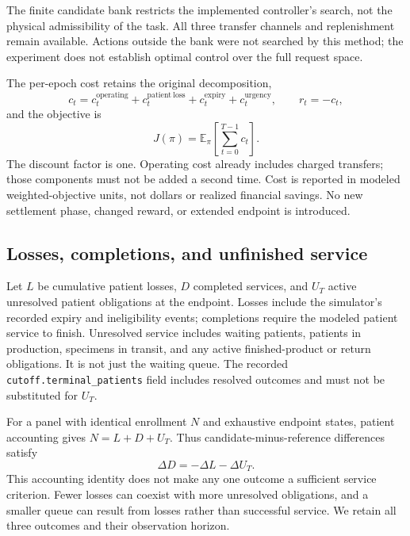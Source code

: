 \documentclass[preprint,12pt]{elsarticle}
\begin{document}
The finite candidate bank restricts the implemented controller's search, not the
physical admissibility of the task. All three transfer channels and replenishment
remain available. Actions outside the bank were not searched by this method;
the experiment does not establish optimal control over the full request space.

The per-epoch cost retains the original decomposition,
\begin{equation}
 c_t=c_t^{\mathrm{operating}}+c_t^{\mathrm{patient\ loss}}
     +c_t^{\mathrm{expiry}}+c_t^{\mathrm{urgency}},
 \qquad r_t=-c_t,
 \label{eq:cost}
\end{equation}
and the objective is
\begin{equation}
 J(\pi)=\mathbb{E}_{\pi}\!\left[\sum_{t=0}^{T-1}c_t\right].
 \label{eq:objective}
\end{equation}
The discount factor is one. Operating cost already includes charged transfers;
those components must not be added a second time. Cost is reported in modeled
weighted-objective units, not dollars or realized financial savings. No new
settlement phase, changed reward, or extended endpoint is introduced.

\subsection{Losses, completions, and unfinished service}
Let $L$ be cumulative patient losses, $D$ completed services, and $U_T$ active
unresolved patient obligations at the endpoint. Losses include the simulator's
recorded expiry and ineligibility events; completions require the modeled
patient service to finish. Unresolved service includes waiting patients,
patients in production, specimens in transit, and any active finished-product
or return obligations. It is not just the waiting queue. The recorded
\texttt{cutoff.terminal\_patients} field includes resolved outcomes and must not
be substituted for $U_T$.

For a panel with identical enrollment $N$ and exhaustive endpoint states,
patient accounting gives $N=L+D+U_T$. Thus candidate-minus-reference
differences satisfy
\begin{equation}
 \Delta D=-\Delta L-\Delta U_T.
 \label{eq:service}
\end{equation}
This accounting identity does not make any one outcome a sufficient service
criterion. Fewer losses can coexist with more unresolved obligations, and a
smaller queue can result from losses rather than successful service. We retain
all three outcomes and their observation horizon.
\end{document}
